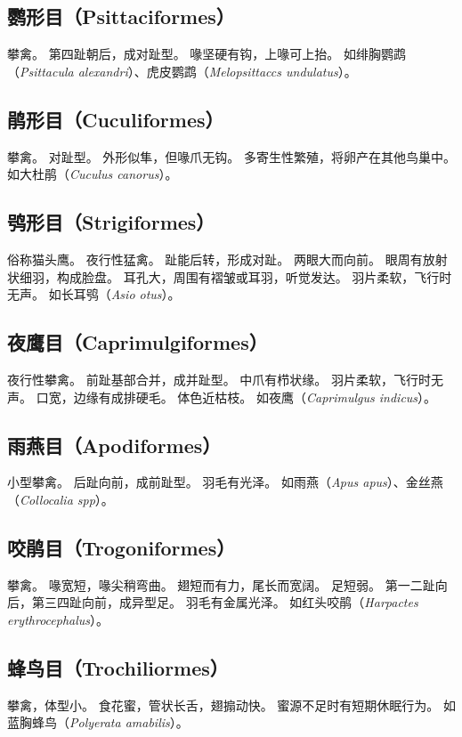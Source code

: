 \documentclass[11pt]{article}
\begin{document}
\subsection{鹦形目（Psittaciformes）}
攀禽。
第四趾朝后，成对趾型。
喙坚硬有钩，上喙可上抬。
如绯胸鹦鹉（\textit{Psittacula alexandri}）、虎皮鹦鹉（\textit{Melopsittaccs undulatus}）。

\subsection{鹃形目（Cuculiformes）}
攀禽。
对趾型。
外形似隼，但喙爪无钩。
多寄生性繁殖，将卵产在其他鸟巢中。
如大杜鹃（\textit{Cuculus canorus}）。

\subsection{鸮形目（Strigiformes）}
俗称猫头鹰。
夜行性猛禽。
趾能后转，形成对趾。
两眼大而向前。
眼周有放射状细羽，构成脸盘。
耳孔大，周围有褶皱或耳羽，听觉发达。
羽片柔软，飞行时无声。
如长耳鸮（\textit{Asio otus}）。

\subsection{夜鹰目（Caprimulgiformes）}
夜行性攀禽。
前趾基部合并，成并趾型。
中爪有栉状缘。
羽片柔软，飞行时无声。
口宽，边缘有成排硬毛。
体色近枯枝。
如夜鹰（\textit{Caprimulgus indicus}）。

\subsection{雨燕目（Apodiformes）}
小型攀禽。
后趾向前，成前趾型。
羽毛有光泽。
如雨燕（\textit{Apus apus}）、金丝燕（\textit{Collocalia spp}）。

\subsection{咬鹃目（Trogoniformes）}
攀禽。
喙宽短，喙尖稍弯曲。
翅短而有力，尾长而宽阔。
足短弱。
第一二趾向后，第三四趾向前，成异型足。
羽毛有金属光泽。
如红头咬鹃（\textit{Harpactes erythrocephalus}）。

\subsection{蜂鸟目（Trochiliormes）}
攀禽，体型小。
食花蜜，管状长舌，翅搧动快。
蜜源不足时有短期休眠行为。
如蓝胸蜂鸟（\textit{Polyerata amabilis}）。
\end{document}
